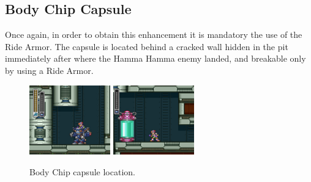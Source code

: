 \subsection{Body Chip Capsule}
Once again, in order to obtain this enhancement it is mandatory the use of the Ride Armor. The capsule is located behind a cracked wall hidden in the pit immediately after where the Hamma Hamma enemy landed, and breakable only by using a Ride Armor.
\begin{figure}[htp]
	\centering
	\includegraphics[height=3cm]{figures/X3/Crush_crawfish/Armor_1.png}
	\includegraphics[height=3cm]{figures/X3/Crush_crawfish/Armor_2.png}
	\caption{Body Chip capsule location.}
\end{figure}

